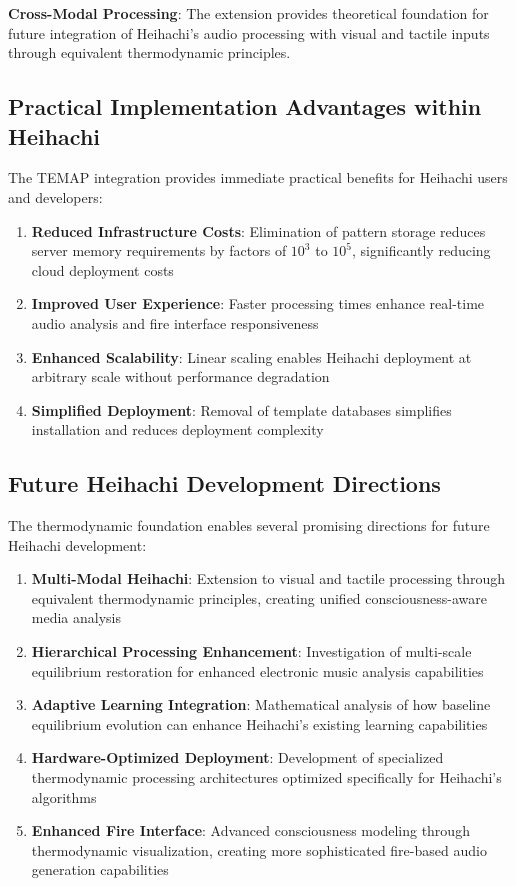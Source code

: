 \documentclass[12pt,a4paper]{article}
\begin{document}
\textbf{Cross-Modal Processing}: The extension provides theoretical foundation for future integration of Heihachi's audio processing with visual and tactile inputs through equivalent thermodynamic principles.

\subsection{Practical Implementation Advantages within Heihachi}

The TEMAP integration provides immediate practical benefits for Heihachi users and developers:

\begin{enumerate}
\item \textbf{Reduced Infrastructure Costs}: Elimination of pattern storage reduces server memory requirements by factors of $10^3$ to $10^5$, significantly reducing cloud deployment costs
\item \textbf{Improved User Experience}: Faster processing times enhance real-time audio analysis and fire interface responsiveness
\item \textbf{Enhanced Scalability}: Linear scaling enables Heihachi deployment at arbitrary scale without performance degradation
\item \textbf{Simplified Deployment}: Removal of template databases simplifies installation and reduces deployment complexity
\end{enumerate}

\subsection{Future Heihachi Development Directions}

The thermodynamic foundation enables several promising directions for future Heihachi development:

\begin{enumerate}
\item \textbf{Multi-Modal Heihachi}: Extension to visual and tactile processing through equivalent thermodynamic principles, creating unified consciousness-aware media analysis
\item \textbf{Hierarchical Processing Enhancement}: Investigation of multi-scale equilibrium restoration for enhanced electronic music analysis capabilities
\item \textbf{Adaptive Learning Integration}: Mathematical analysis of how baseline equilibrium evolution can enhance Heihachi's existing learning capabilities
\item \textbf{Hardware-Optimized Deployment}: Development of specialized thermodynamic processing architectures optimized specifically for Heihachi's algorithms
\item \textbf{Enhanced Fire Interface}: Advanced consciousness modeling through thermodynamic visualization, creating more sophisticated fire-based audio generation capabilities
\end{enumerate}
\end{document}
